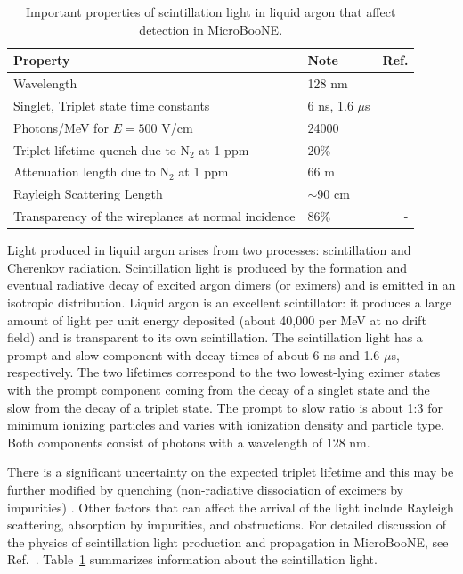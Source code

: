 \begin{table}[t]
   \centering
    \caption{Important properties of scintillation light in liquid argon that affect detection in MicroBooNE.} 
    \begin{tabular}{llr} %
    \hline
    Property & Note & Ref.\\
    \hline
    Wavelength & 128 nm & \cite{saito_wavelength}\\
    Singlet, Triplet state time constants & 6 ns, 1.6 $\mu$s &\cite{singtrip_collection} \\
    Photons/MeV for $E=500$ V/cm & 24000 & \cite{Amerio:2004ze}\\
     Triplet lifetime quench due to N$_2$ at 1 ppm  & 20$\%$ & \cite{Acciarri:2008kv} \\
     Attenuation length due to N$_2$ at 1 ppm & 66 m &\cite{Jones:2013bca} \\
     Rayleigh Scattering Length & $\sim$90 cm &\cite{Rayleigh} \\
     Transparency of the wireplanes at normal incidence & 86$\%$ & -\\
    \hline
   \end{tabular}
   \label{tab:lightparam}
\end{table} 

Light produced in liquid argon arises from two processes: scintillation and Cherenkov radiation.  
Scintillation light is produced by the formation and eventual radiative decay of excited argon dimers (or eximers) and is emitted in an isotropic distribution.  Liquid argon is an excellent scintillator: it produces a large amount of light per unit energy deposited (about 40,000 per MeV at no drift field) and is transparent to its own scintillation. %
The scintillation light has a prompt and slow component with decay times of about 6 ns and 1.6 $\mu$s, respectively. The two lifetimes correspond to the two lowest-lying eximer states with the prompt component coming from the decay of a singlet state and the slow from the decay of a triplet state.  The prompt to slow ratio is about 1:3 for minimum ionizing particles and varies with ionization density and particle type. Both components consist of photons with a wavelength of 128 nm.

There is a significant uncertainty on the expected triplet lifetime \cite{singtrip_collection} and this may be further modified by quenching (non-radiative dissociation of excimers by impurities)  \cite{WARPquench}.  Other factors that can affect the arrival of the light include Rayleigh scattering, absorption by impurities, and obstructions.  For detailed discussion of the physics of scintillation light production and propagation in MicroBooNE, see Ref.~\cite{Benthesis}. Table~\ref{tab:lightparam} summarizes information about the scintillation light.  

